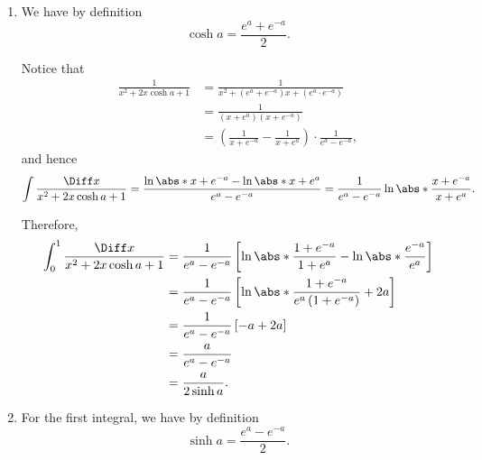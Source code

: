 \Question{\currfilebase}

\begin{enumerate}
    \item We have by definition
          \[
              \cosh a = \frac{e^a + e^{-a}}{2}.
          \]

          Notice that
          \begin{align*}
              \frac{1}{x^2 + 2x \cosh a + 1} & = \frac{1}{x^2 + (e^a + e^{-a}) x + (e^a \cdot e^{-a})}                                   \\
                                             & = \frac{1}{(x + e^a) (x + e^{-a})}                                                        \\
                                             & = \left(\frac{1}{x + e^{-a}} - \frac{1}{x + e^{a}}\right) \cdot \frac{1}{e^{a} - e^{-a}},
          \end{align*}
          and hence
          \[
              \int \frac{\Diff x}{x^2 + 2x \cosh a + 1} = \frac{\ln \abs*{x + e^{-a}} - \ln \abs*{x + e^a}}{e^a - e^{-a}} = \frac{1}{e^a - e^{-a}} \ln \abs*{\frac{x + e^{-a}}{x + e^a}}.
          \]

          Therefore,
          \begin{align*}
              \int_{0}^{1} \frac{\Diff x}{x^2 + 2x \cosh a + 1} & = \frac{1}{e^a - e^{-a}} \left[\ln \abs*{\frac{1 + e^{-a}}{1 + e^a}} - \ln \abs*{\frac{e^{-a}}{e^a}}\right] \\
                                                                & = \frac{1}{e^a - e^{-a}} \left[\ln \abs*{\frac{1 + e^{-a}}{e^a \left(1 + e^{-a}\right)}} + 2a\right]        \\
                                                                & = \frac{1}{e^a - e^{-a}} \left[-a + 2a\right]                                                               \\
                                                                & = \frac{a}{e^a - e^{-a}}                                                                                    \\
                                                                & = \frac{a}{2 \sinh a}.
          \end{align*}

    \item For the first integral, we have by definition
          \[
              \sinh a = \frac{e^a - e^{-a}}{2}.
          \]


\end{enumerate}
